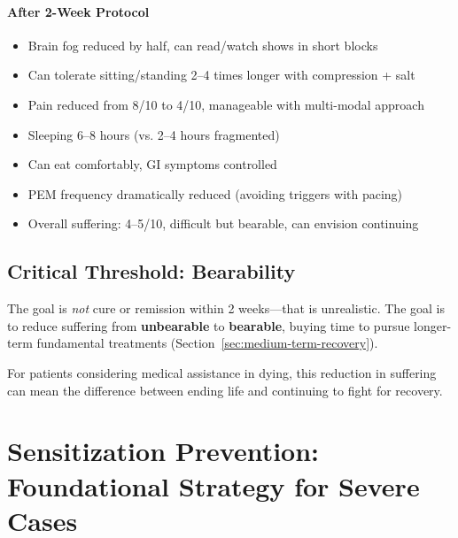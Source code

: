 \paragraph{After 2-Week Protocol}
\begin{itemize}
    \item Brain fog reduced by half, can read/watch shows in short blocks
    \item Can tolerate sitting/standing 2--4 times longer with compression + salt
    \item Pain reduced from 8/10 to 4/10, manageable with multi-modal approach
    \item Sleeping 6--8 hours (vs. 2--4 hours fragmented)
    \item Can eat comfortably, GI symptoms controlled
    \item PEM frequency dramatically reduced (avoiding triggers with pacing)
    \item Overall suffering: 4--5/10, difficult but bearable, can envision continuing
\end{itemize}

\subsection{Critical Threshold: Bearability}

The goal is \emph{not} cure or remission within 2 weeks—that is unrealistic. The goal is to reduce suffering from \textbf{unbearable} to \textbf{bearable}, buying time to pursue longer-term fundamental treatments (Section~\ref{sec:medium-term-recovery}).

For patients considering medical assistance in dying, this reduction in suffering can mean the difference between ending life and continuing to fight for recovery.

\section{Sensitization Prevention: Foundational Strategy for Severe Cases}
\label{sec:sensitization-prevention-severe}

